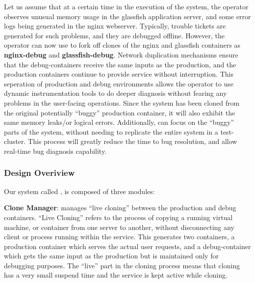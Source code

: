 Let us assume that at a certain time in the execution of the system, the operator observes unusual memory usage in the glassfish application server, and some error logs being generated in the nginx webserver. 
Typically, trouble tickets are generated for such problems, and they are debugged offline.
However, the operator can now use \parikshan to fork off clones of the nginx and glassfish containers as \textbf{nginx-debug} and \textbf{glassfish-debug}.
Network duplication mechanisms ensure that the debug-containers receive the same inputs as the production, and the production containers continue to provide service without interruption.
This seperation of production and debug environments allows the operator to use dynamic instrumentation tools to do deeper diagnosis without fearing any problems in the user-facing operations.
Since the system has been cloned from the original potentially ``buggy'' production container, it will also exhibit the same memory leaks/or logical errors.
Additionally, \parikshan can focus on the ``buggy'' parts of the system, without needing to replicate the entire system in a test-cluster. This process will greatly reduce the time to bug resolution, and allow real-time bug diagnosis capability.

\subsubsection{Design Overiview}
\label{sec:design}

Our system called \parikshan, is composed of three modules: 


 \textbf{Clone Manager}: manages ``live cloning'' between the production and debug containers.
``Live Cloning'' refers to the process of copying a running virtual machine, or container from one server to another, without disconnecting any client or process running within the service.
This generates two containers, a production container which serves the actual user requests, and a debug-container which gets the same input as the production but is maintained only for debugging purposes.
The ``live'' part in the cloning process means that cloning has a very small suspend time and the service is kept active while cloning. \\

